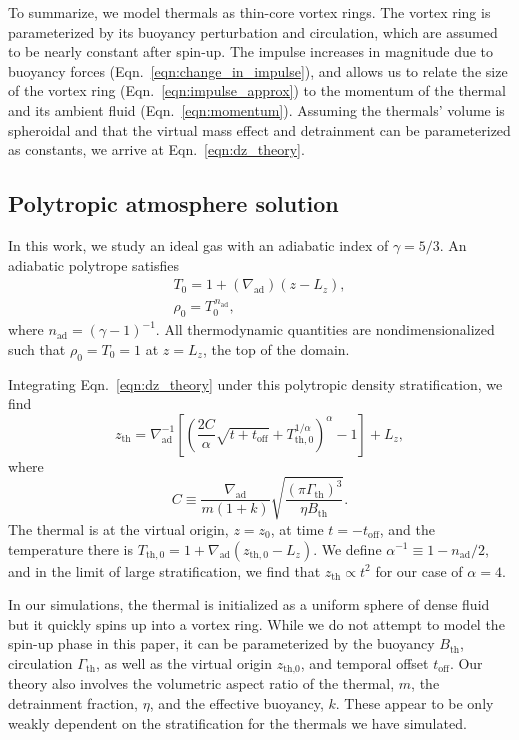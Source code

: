 \documentclass[twocolumn, amsmath, amsfonts, amssymb, trackchanges]{aastex62}
\newcommand{\grad}{\ensuremath{\nabla}}
\begin{document}
To summarize, we model thermals as thin-core vortex rings.
The vortex ring is parameterized by its buoyancy perturbation and circulation, which are assumed to be nearly constant after spin-up.
The impulse increases in magnitude due to buoyancy forces (Eqn.~\ref{eqn:change_in_impulse}), and allows us to relate the size of the vortex ring (Eqn.~\ref{eqn:impulse_approx}) to the momentum of the thermal and its ambient fluid (Eqn.~\ref{eqn:momentum}).
Assuming the thermals' volume is spheroidal and that the virtual mass effect and detrainment can be parameterized as constants, we arrive at Eqn.~\ref{eqn:dz_theory}.

\subsection{Polytropic atmosphere solution}
In this work, we study an ideal gas with an adiabatic index of $\gamma = 5/3$.
An adiabatic polytrope satisfies
\begin{gather}\label{eqn:T0}
T_0 = 1 + (\grad_{\text{ad}})(z - L_z), \\
\rho_0 = T_0^{\,n_{\text{ad}}},
\label{eqn:polytrope}
\end{gather}
where $n_{\text{ad}} = (\gamma-1)^{-1}$.
All thermodynamic quantities are nondimensionalized such that $\rho_0 = T_0 = 1$ at $z = L_z$, the top of the domain.

Integrating Eqn.~\ref{eqn:dz_theory} under this polytropic density stratification, we find
\begin{equation}
z_{\text{th}} = \grad_{\text{ad}}^{-1}\left[\left(\frac{2C}{ \alpha } \sqrt{t + t_{\text{off}}} + T_{\text{th},0}^{1/\alpha}  \right)^{\alpha} - 1\right] + L_z,
\label{eqn:theory_z}
\end{equation}
where 
$$
C \equiv \frac{\grad_{\text{ad}}}{m(1 + k)} \sqrt{\frac{(\pi\Gamma_{\text{th}})^3}{\eta B_{\text{th}}}}.
$$ 
The thermal is at the virtual origin, $z=z_0$, at time $t=-t_{\text{off}}$, and the temperature there is $T_{\text{th},0} = 1 + \grad_{\text{ad}}(z_{\text{th},0} - L_z)$.
We define $\alpha^{-1} \equiv 1 - n_{\text{ad}}/2$, and in the limit of large stratification, we find that $z_{\text{th}} \propto t^2$ for our case of $\alpha = 4$. 

In our simulations, the thermal is initialized as a uniform sphere of dense fluid but it quickly spins up into a vortex ring. 
While we do not attempt to model the spin-up phase in this paper, it can be parameterized by the buoyancy $B_{\text{th}}$, circulation $\Gamma_{\text{th}}$, as well as the virtual origin $z_{\text{th,0}}$, and temporal offset $t_{\text{off}}$. 
Our theory also involves the volumetric aspect ratio of the thermal, $m$, the detrainment fraction, $\eta$, and the effective buoyancy, $k$. 
These appear to be only weakly dependent on the stratification for the thermals we have simulated.
\end{document}

